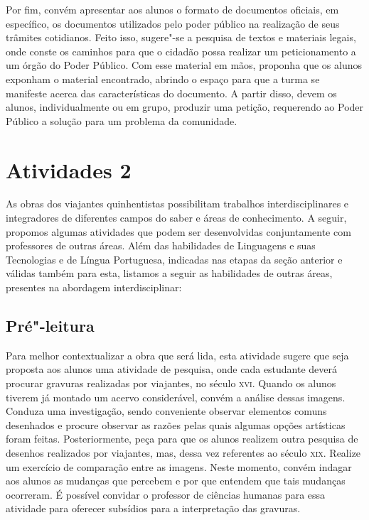 \documentclass[12pt]{extarticle}
\begin{document}
Por fim, convém apresentar aos alunos o formato de
documentos oficiais, em específico, os documentos utilizados pelo poder
público na realização de seus trâmites cotidianos. Feito isso, sugere"-se
a pesquisa de textos e materiais legais, onde conste os caminhos para
que o cidadão possa realizar um peticionamento a um órgão do Poder
Público. Com esse material em mãos, proponha que os alunos exponham o
material encontrado, abrindo o espaço para que a turma se manifeste
acerca das características do documento. A partir disso, devem os
alunos, individualmente ou em grupo, produzir uma petição, requerendo ao
Poder Público a solução para um problema da comunidade.

\section{Atividades 2}

As obras dos viajantes quinhentistas possibilitam trabalhos
interdisciplinares e integradores de diferentes campos do saber e áreas
de conhecimento. A seguir, propomos algumas atividades que podem ser
desenvolvidas conjuntamente com professores de outras áreas. Além das
habilidades de Linguagens e suas Tecnologias e de Língua Portuguesa,
indicadas nas etapas da seção anterior e válidas também para esta,
listamos a seguir as habilidades de outras áreas, presentes na abordagem
interdisciplinar:


\subsection{Pré"-leitura}

Para melhor contextualizar a obra que será lida, esta
atividade sugere que seja proposta aos alunos uma atividade de pesquisa,
onde cada estudante deverá procurar gravuras realizadas por viajantes,
no século \textsc{xvi}. Quando os alunos tiverem já montado um acervo
considerável, convém a análise dessas imagens. Conduza uma investigação,
sendo conveniente observar elementos comuns desenhados e procure
observar as razões pelas quais algumas opções artísticas foram feitas.
Posteriormente, peça para que os alunos realizem outra pesquisa de
desenhos realizados por viajantes, mas, dessa vez referentes ao século
\textsc{xix}. Realize um exercício de comparação entre as imagens. Neste momento,
convém indagar aos alunos as mudanças que percebem e por que entendem
que tais mudanças ocorreram. É possível convidar o professor de ciências
humanas para essa atividade para oferecer subsídios para a interpretação
das gravuras.
\end{document}

